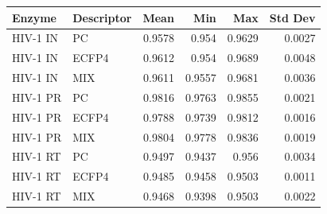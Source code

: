 \begin{tabular}{llrrrr}
\toprule
Enzyme & Descriptor & Mean & Min & Max & Std Dev \\
\midrule
HIV-1 IN & PC & 0.9578 & 0.954 & 0.9629 & 0.0027 \\
HIV-1 IN & ECFP4 & 0.9612 & 0.954 & 0.9689 & 0.0048 \\
HIV-1 IN & MIX & 0.9611 & 0.9557 & 0.9681 & 0.0036 \\
HIV-1 PR & PC & 0.9816 & 0.9763 & 0.9855 & 0.0021 \\
HIV-1 PR & ECFP4 & 0.9788 & 0.9739 & 0.9812 & 0.0016 \\
HIV-1 PR & MIX & 0.9804 & 0.9778 & 0.9836 & 0.0019 \\
HIV-1 RT & PC & 0.9497 & 0.9437 & 0.956 & 0.0034 \\
HIV-1 RT & ECFP4 & 0.9485 & 0.9458 & 0.9503 & 0.0011 \\
HIV-1 RT & MIX & 0.9468 & 0.9398 & 0.9503 & 0.0022 \\
\bottomrule
\end{tabular}
